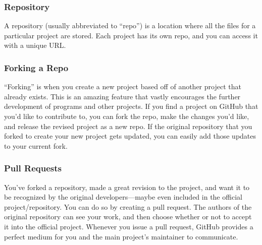 \documentclass[a4paper,8pt]{article}
\begin{document}
\begin{addmargin}[2em]{0em}%
\subsubsection*{Repository}
\begin{addmargin}[2em]{0em}%
A repository (usually abbreviated to “repo”) is a location where all the files for a particular project are stored. Each project has its own repo, and you can access it with a unique URL.
\end{addmargin}
\end{addmargin}

\begin{addmargin}[2em]{0em}%
\subsubsection*{Forking a Repo}
\begin{addmargin}[2em]{0em}%
“Forking” is when you create a new project based off of another project that already exists. This is an amazing feature that vastly encourages the further development of programs and other projects. If you find a project on GitHub that you’d like to contribute to, you can fork the repo, make the changes you’d like, and release the revised project as a new repo. If the original repository that you forked to create your new project gets updated, you can easily add those updates to your current fork.
\end{addmargin}
\end{addmargin}

\begin{addmargin}[2em]{0em}%
\subsubsection*{Pull Requests}
\begin{addmargin}[2em]{0em}%
You’ve forked a repository, made a great revision to the project, and want it to be recognized by the original developers—maybe even included in the official project/repository. You can do so by creating a pull request. The authors of the original repository can see your work, and then choose whether or not to accept it into the official project. Whenever you issue a pull request, GitHub provides a perfect medium for you and the main project’s maintainer to communicate.
\end{addmargin}
\end{addmargin}
\end{document}
